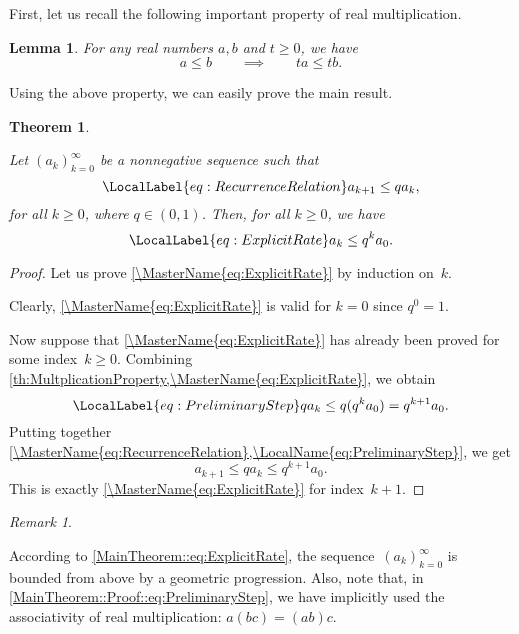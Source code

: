 \documentclass{article}
\newtheorem{theorem}{Theorem}
\newtheorem{lemma}{Lemma}
\theoremstyle{remark}
\newtheorem{remark}{Remark}
\begin{document}
  First, let us recall the following important property of real multiplication.

  \begin{lemma}\label{th:MultplicationProperty}
    For any real numbers $a, b$ and $t \geq 0$, we have
    \[
      a \leq b
      \qquad \implies \qquad
      t a \leq t b.
    \]
  \end{lemma}

  Using the above property, we can easily prove the main result.

  \begin{theorem}\label{th:MainTheorem}

    Let $(a_k)_{k = 0}^\infty$ be a nonnegative sequence such that
    \begin{equation}\LocalLabel{eq:RecurrenceRelation}
      a_{k + 1} \leq q a_k,
    \end{equation}
    for all $k \geq 0$, where $q \in (0, 1)$. Then, for all $k \geq 0$, we have
    \begin{equation}\LocalLabel{eq:ExplicitRate}
      a_k \leq q^k a_0.
    \end{equation}
  \end{theorem}

  \begin{proof}

    Let us prove \cref{\MasterName{eq:ExplicitRate}} by induction on~$k$.

    Clearly, \cref{\MasterName{eq:ExplicitRate}} is valid for $k = 0$
    since $q^0 = 1$.

    Now suppose that \cref{\MasterName{eq:ExplicitRate}} has already been proved
    for some index~$k \geq 0$. Combining
    \cref{th:MultplicationProperty,\MasterName{eq:ExplicitRate}},
    we obtain
    \begin{equation}\LocalLabel{eq:PreliminaryStep}
      q a_k \leq q (q^k a_0) = q^{k + 1} a_0.
    \end{equation}
    Putting together
    \cref{\MasterName{eq:RecurrenceRelation},\LocalName{eq:PreliminaryStep}},
    we get
    \[
      a_{k + 1} \leq q a_k \leq q^{k + 1} a_0.
    \]
    This is exactly \cref{\MasterName{eq:ExplicitRate}} for index~$k + 1$.
  \end{proof}

  \begin{remark}
    \label{th:MinorRemark}

    According to \cref{MainTheorem::eq:ExplicitRate},
    the sequence~$(a_k)_{k = 0}^{\infty}$ is bounded from above
    by a geometric progression. Also, note that, in
    \cref{MainTheorem::Proof::eq:PreliminaryStep}, we have implicitly used the
    associativity of real multiplication: $a (b c) = (a b) c$.
  \end{remark}
\end{document}
